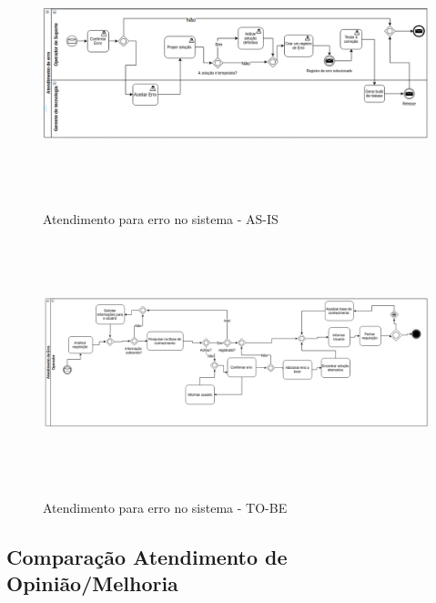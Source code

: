 \begin{figure}[!h]
\caption{Atendimento para erro no sistema - AS-IS}
\centering %
\includegraphics[width=16cm, height=7cm]{as-is/03_atendimento_de_erro.png}
\label{figura:atendimento_de_erro_as_is}
\end{figure}


\begin{figure}[!h]
\caption{Atendimento para erro no sistema - TO-BE}
\centering %
\includegraphics[width=16cm,height=7cm]{to_be/03_atendimento_de_erro.png}
\label{figura:atendimento_de_erro_to_be}
\end{figure}

\clearpage%


\subsection{Comparação Atendimento de Opinião/Melhoria}

